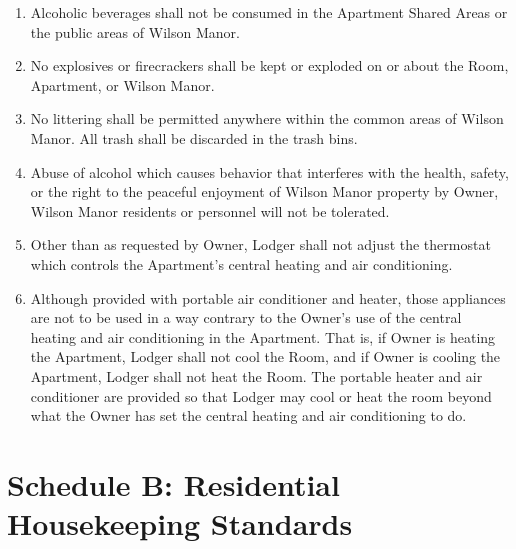 \documentclass[12pt,letterpaper]{article}
\newcommand{\lodger}{Lodger}
\newcommand{\standards}{Residential Housekeeping Standards}
\newcommand{\condo}{Wilson Manor}
\newcommand{\apt}{Apartment}
\newcommand{\room}{Room}
\newcommand{\shared}{Apartment Shared Areas}
\begin{document}
{{\begin{enumerate}
		\item Alcoholic beverages shall not be consumed in the \shared{} or the public areas of \condo{}. 
		\item No explosives or firecrackers shall be kept or exploded on or about the \room{}, \apt{}, or \condo{}. 
		\item No littering shall be permitted anywhere within the common areas of \condo{}. All trash shall be discarded in the trash bins. 
		\item Abuse of alcohol which causes behavior that interferes with the health, safety, or the right to the peaceful enjoyment of \condo{} property by Owner, \condo{} residents or personnel will not be tolerated. 
		\item Other than as requested by Owner, \lodger{} shall not adjust the thermostat which controls the \apt{}'s central heating and air conditioning.
		\item Although provided with portable air conditioner and heater, those appliances are not to be used in a way contrary to the Owner's use of the central heating and air conditioning in the \apt{}. That is, if Owner is heating the \apt{}, \lodger{} shall not cool the \room{}, and if Owner is cooling the \apt{}, \lodger{} shall not heat the \room{}. The portable heater and air conditioner are provided so that \lodger{} may cool or heat the room beyond what the Owner has set the central heating and air conditioning to do.
	\end{enumerate}


	\newpage
	\section*{Schedule B: \standards{}} \label{standards}

}}
\end{document}
